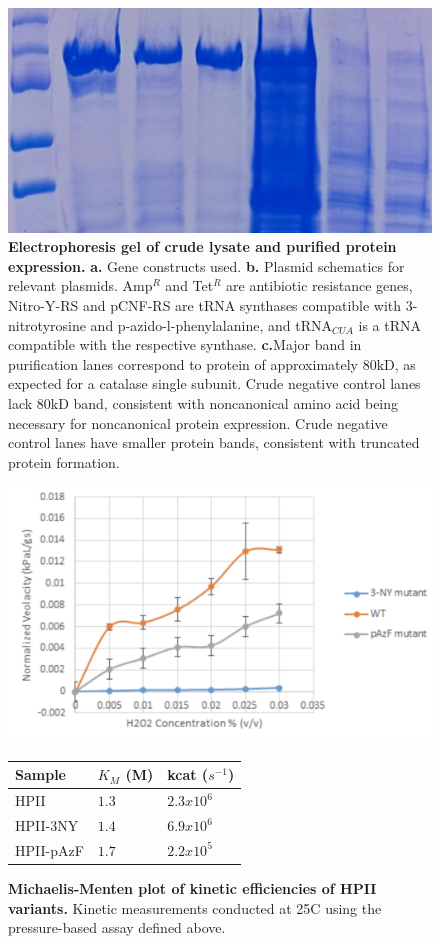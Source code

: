 \documentclass[9pt,twocolumn,twoside]{pnas-new}
\begin{document}
\begin{figure}
  \centering
  \includegraphics[width=\linewidth]{figures/pure-gel}
  \caption{\textbf{Electrophoresis gel of crude lysate and purified protein expression.} \textbf{a.} Gene constructs used. \textbf{b.} Plasmid schematics for relevant plasmids. Amp$^R$ and Tet$^R$ are antibiotic resistance genes, Nitro-Y-RS and pCNF-RS are tRNA synthases compatible with 3-nitrotyrosine and p-azido-l-phenylalanine, and tRNA$_{CUA}$ is a tRNA compatible with the respective synthase. \textbf{c.}Major band in purification lanes correspond to protein of approximately 80kD, as expected for a catalase single subunit. Crude negative control lanes lack 80kD band, consistent with noncanonical amino acid being necessary for noncanonical protein expression. Crude negative control lanes have smaller protein bands, consistent with truncated protein formation.}
  \label{fig:pure-gel}
\end{figure}

\begin{figure}
  \centering
  \includegraphics[width=0.9\linewidth]{figures/kinetics.png}
  \begin{tabular}{lll}
      \hline
      Sample  & $K_M$ (M) & kcat ($s^{-1}$) \\
      \hline
      HPII        & $1.3$ & $2.3x10^6$\\
      HPII-3NY    & $1.4$ & $6.9x10^6$\\
      HPII-pAzF   & $1.7$ & $2.2x10^5$\\
      \hline
  \end{tabular}
  \caption{\textbf{Michaelis-Menten plot of kinetic efficiencies of HPII variants.} Kinetic measurements conducted at 25\degree C using the pressure-based assay defined above.}
  \label{fig:kinetics}
\end{figure}
\end{document}
